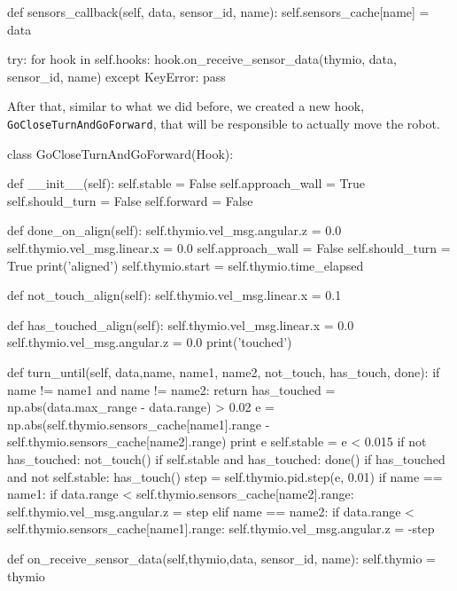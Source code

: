 \documentclass[11pt]{article}
\begin{document}
\begin{python}
 def sensors_callback(self, data, sensor_id, name):
        self.sensors_cache[name] = data

        try:
            for hook in self.hooks:
                hook.on_receive_sensor_data(thymio, data, sensor_id, name)
        except KeyError:
            pass	
\end{python}

After that, similar to what we did before, we created a new hook, \\\texttt{GoCloseTurnAndGoForward}, that will be responsible to actually move the robot.

\begin{python}
class GoCloseTurnAndGoForward(Hook):

    def __init__(self):
        self.stable = False
        self.approach_wall = True
        self.should_turn = False
        self.forward = False

    def done_on_align(self):
        self.thymio.vel_msg.angular.z = 0.0
        self.thymio.vel_msg.linear.x = 0.0
        self.approach_wall = False
        self.should_turn = True 
        print('aligned')
        self.thymio.start = self.thymio.time_elapsed

    def not_touch_align(self):
        self.thymio.vel_msg.linear.x = 0.1

    def has_touched_align(self):
        self.thymio.vel_msg.linear.x = 0.0
        self.thymio.vel_msg.angular.z = 0.0
        print('touched')
        
    def turn_until(self, data,name,  name1, name2, not_touch, has_touch, done):
        if name != name1 and name != name2: return 
        has_touched = np.abs(data.max_range - data.range) > 0.02
        e = np.abs(self.thymio.sensors_cache[name1].range -  self.thymio.sensors_cache[name2].range)
        print  e
        self.stable = e < 0.015
        if not has_touched:
            not_touch()
        if self.stable and has_touched:
            done()
        if has_touched and not self.stable:
            has_touch()
            step = self.thymio.pid.step(e, 0.01)
            if name == name1:
                if  data.range < self.thymio.sensors_cache[name2].range:
                    self.thymio.vel_msg.angular.z = step
            elif name == name2:
                if  data.range < self.thymio.sensors_cache[name1].range:
                    self.thymio.vel_msg.angular.z = -step

    def on_receive_sensor_data(self,thymio,data, sensor_id, name):
        self.thymio = thymio


\end{python}
\end{document}
